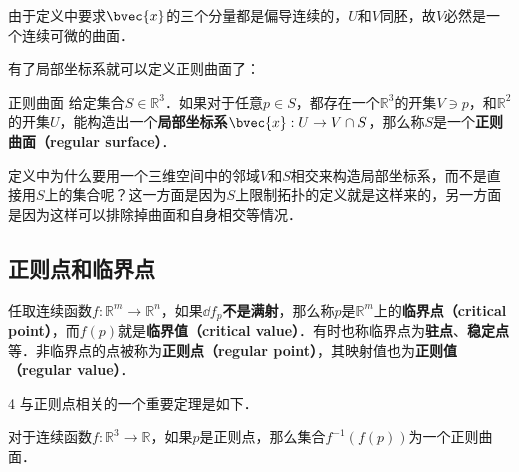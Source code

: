 由于定义中要求$\bvec{x}$的三个分量都是偏导连续的，$U$和$V$同胚，故$V$必然是一个连续可微的曲面．

有了局部坐标系就可以定义正则曲面了：

\begin{definition}{正则曲面}
给定集合$S\in\mathbb{R}^3$．如果对于任意$p\in S$，都存在一个$\mathbb{R}^3$的开集$V\ni p$，和$\mathbb{R}^2$的开集$U$，能构造出一个\textbf{局部坐标系}$\bvec{x}:U\to V\cap S$，那么称$S$是一个\textbf{正则曲面（regular surface）}．
\end{definition}

定义中为什么要用一个三维空间中的邻域$V$和$S$相交来构造局部坐标系，而不是直接用$S$上的集合呢？这一方面是因为$S$上限制拓扑的定义就是这样来的，另一方面是因为这样可以排除掉曲面和自身相交等情况．

\subsection{正则点和临界点}

\begin{definition}{}
任取连续函数$f:\mathbb{R}^m\to\mathbb{R}^n$，如果$\dd f_p$\textbf{不是满射}，那么称$p$是$\mathbb{R}^m$上的\textbf{临界点（critical point）}，而$f(p)$就是\textbf{临界值（critical value）}．有时也称临界点为\textbf{驻点}、\textbf{稳定点}等．非临界点的点被称为\textbf{正则点（regular point）}，其映射值也为\textbf{正则值（regular value）}．
\end{definition}
4
与正则点相关的一个重要定理是如下．

\begin{theorem}{}
对于连续函数$f:\mathbb{R}^3\to\mathbb{R}$，如果$p$是正则点，那么集合$f^{-1}(f(p))$为一个正则曲面．
\end{theorem}


